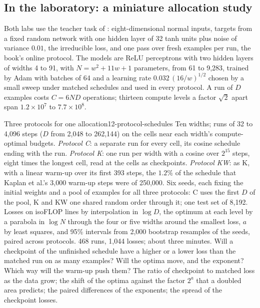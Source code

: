 \begin{refsection}
\section{In the laboratory: a miniature allocation study}\label{sec:protocol:lab}

Both labs use the teacher task of : eight-dimensional normal inputs, targets from a fixed random network with one hidden layer of 32 tanh units plus noise of variance $0.01$, the irreducible loss, and one pass over fresh examples per run, the book's online protocol. The models are ReLU perceptrons with two hidden layers of widths 4 to 91, with $N=w^2+11w+1$ parameters, from 61 to 9,283, trained by Adam with batches of 64 and a learning rate $0.032\,(16/w)^{1/2}$ chosen by a small sweep under matched schedules and used in every protocol. A run of $D$ examples costs $C=6ND$ operations; thirteen compute levels a factor $\sqrt2$ apart span $1.2\times10^7$ to $7.7\times10^8$.

\begin{lab}{Three protocols for one allocation}{12-protocol-schedules}\label{lab:protocol:schedules}
 Ten widths; runs of 32 to 4,096 steps ($D$ from 2,048 to 262,144) on the cells near each width's compute-optimal budgets. \emph{Protocol C}: a separate run for every cell, its cosine schedule ending with the run. \emph{Protocol K}: one run per width with a cosine over $2^{15}$ steps, eight times the longest cell, read at the cells as checkpoints. \emph{Protocol KW}: as K, with a linear warm-up over its first 393 steps, the $1.2\%$ of the schedule that Kaplan et al.'s 3,000 warm-up steps were of 250,000. Six seeds, each fixing the initial weights and a pool of examples for all three protocols: C uses the first $D$ of the pool, K and KW one shared random order through it; one test set of 8,192. Losses on isoFLOP lines by interpolation in $\log D$, the optimum at each level by a parabola in $\log N$ through the four or five widths around the smallest loss, $a$ by least squares, and 95\% intervals from 2,000 bootstrap resamples of the seeds, paired across protocols. 468 runs, 1,044 losses; about three minutes.
 Will a checkpoint of the unfinished schedule have a higher or a lower loss than the matched run on as many examples? Will the optima move, and the exponent? Which way will the warm-up push them?
 The ratio of checkpoint to matched loss as the data grow; the shift of the optima against the factor $2^a$ that a doubled area predicts; the paired differences of the exponents; the spread of the checkpoint losses.
\end{lab}


\end{refsection}
